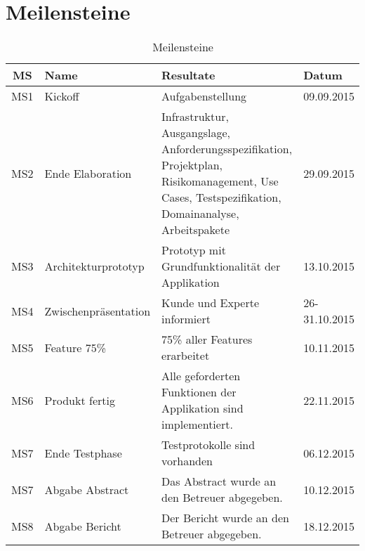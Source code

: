 
\section{Meilensteine}
\label{sec:Meilensteine}


\begin{table}[H]
\begin{tabularx}{\textwidth}{ c | l | X | l}
\textbf{MS} & \textbf{Name} & \textbf{Resultate}  & \textbf{Datum} \\ \hline
MS1 & Kickoff              & Aufgabenstellung & 09.09.2015 \\ \hline
MS2 & Ende Elaboration       & Infrastruktur, Ausgangslage, Anforderungsspezifikation, Projektplan, Risikomanagement, Use Cases, Testspezifikation, Domainanalyse, Arbeitspakete	& 29.09.2015 \\ \hline
MS3 & Architekturprototyp  & Prototyp mit Grundfunktionalität der Applikation	& 13.10.2015 \\ \hline
MS4 & Zwischenpräsentation & Kunde und Experte informiert & 26-31.10.2015 \\ \hline
MS5 & Feature 75\%         & 75\% aller Features erarbeitet & 10.11.2015 \\ \hline
MS6 & Produkt fertig       & Alle geforderten Funktionen der Applikation sind implementiert. & 22.11.2015 \\ \hline
MS7 & Ende Testphase       & Testprotokolle sind vorhanden & 06.12.2015 \\ \hline
MS7 & Abgabe Abstract      & Das Abstract wurde an den Betreuer abgegeben. & 10.12.2015 \\ \hline
MS8 & Abgabe Bericht       & Der Bericht wurde an den Betreuer abgegeben. & 18.12.2015 \\
\end{tabularx}
\caption{Meilensteine}
\end{table}

\pagebreak